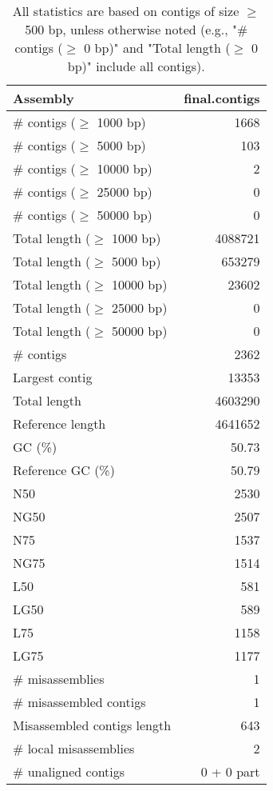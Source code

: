 \documentclass[12pt,a4paper]{article}
\begin{document}
\begin{table}[ht]
\begin{center}
\caption{All statistics are based on contigs of size $\geq$ 500 bp, unless otherwise noted (e.g., "\# contigs ($\geq$ 0 bp)" and "Total length ($\geq$ 0 bp)" include all contigs).}
\begin{tabular}{|l*{1}{|r}|}
\hline
Assembly & final.contigs \\ \hline
\# contigs ($\geq$ 1000 bp) & 1668 \\ \hline
\# contigs ($\geq$ 5000 bp) & 103 \\ \hline
\# contigs ($\geq$ 10000 bp) & 2 \\ \hline
\# contigs ($\geq$ 25000 bp) & 0 \\ \hline
\# contigs ($\geq$ 50000 bp) & 0 \\ \hline
Total length ($\geq$ 1000 bp) & 4088721 \\ \hline
Total length ($\geq$ 5000 bp) & 653279 \\ \hline
Total length ($\geq$ 10000 bp) & 23602 \\ \hline
Total length ($\geq$ 25000 bp) & 0 \\ \hline
Total length ($\geq$ 50000 bp) & 0 \\ \hline
\# contigs & 2362 \\ \hline
Largest contig & 13353 \\ \hline
Total length & 4603290 \\ \hline
Reference length & 4641652 \\ \hline
GC (\%) & 50.73 \\ \hline
Reference GC (\%) & 50.79 \\ \hline
N50 & 2530 \\ \hline
NG50 & 2507 \\ \hline
N75 & 1537 \\ \hline
NG75 & 1514 \\ \hline
L50 & 581 \\ \hline
LG50 & 589 \\ \hline
L75 & 1158 \\ \hline
LG75 & 1177 \\ \hline
\# misassemblies & 1 \\ \hline
\# misassembled contigs & 1 \\ \hline
Misassembled contigs length & 643 \\ \hline
\# local misassemblies & 2 \\ \hline
\# unaligned contigs & 0 + 0 part \\ \hline

\end{tabular}
\end{center}
\end{table}
\end{document}
